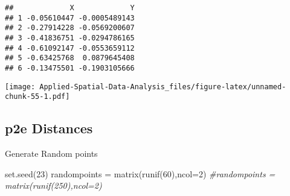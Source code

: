 \documentclass[
]{book}
\newenvironment{Shaded}{\begin{snugshade}}{\end{snugshade}}
\newcommand{\AttributeTok}[1]{\textcolor[rgb]{0.77,0.63,0.00}{#1}}
\newcommand{\CommentTok}[1]{\textcolor[rgb]{0.56,0.35,0.01}{\textit{#1}}}
\newcommand{\ControlFlowTok}[1]{\textcolor[rgb]{0.13,0.29,0.53}{\textbf{#1}}}
\newcommand{\DecValTok}[1]{\textcolor[rgb]{0.00,0.00,0.81}{#1}}
\newcommand{\FunctionTok}[1]{\textcolor[rgb]{0.00,0.00,0.00}{#1}}
\newcommand{\NormalTok}[1]{#1}
\newcommand{\OtherTok}[1]{\textcolor[rgb]{0.56,0.35,0.01}{#1}}
\newcommand{\SpecialCharTok}[1]{\textcolor[rgb]{0.00,0.00,0.00}{#1}}
\newcommand{\StringTok}[1]{\textcolor[rgb]{0.31,0.60,0.02}{#1}}
\begin{document}
\begin{verbatim}
##             X             Y
## 1 -0.05610447 -0.0005489143
## 2 -0.27914228 -0.0569200607
## 3 -0.41836751 -0.0294786165
## 4 -0.61092147 -0.0553659112
## 5 -0.63425768  0.0879645408
## 6 -0.13475501 -0.1903105666
\end{verbatim}

\begin{Shaded}
\end{Shaded}

\texttt{[image: Applied-Spatial-Data-Analysis\_files/figure-latex/unnamed-chunk-55-1.pdf]}

\hypertarget{p2e-distances}{%
\subsection{p2e Distances}\label{p2e-distances}}

Generate Random points

\begin{Shaded}
\begin{Highlighting}[]
\FunctionTok{set.seed}\NormalTok{(}\DecValTok{23}\NormalTok{)}
\NormalTok{randompoints }\OtherTok{=} \FunctionTok{matrix}\NormalTok{(}\FunctionTok{runif}\NormalTok{(}\DecValTok{60}\NormalTok{),}\AttributeTok{ncol=}\DecValTok{2}\NormalTok{)}
\CommentTok{\#randompoints = matrix(runif(250),ncol=2)}
\end{Highlighting}
\end{Shaded}
\end{document}
